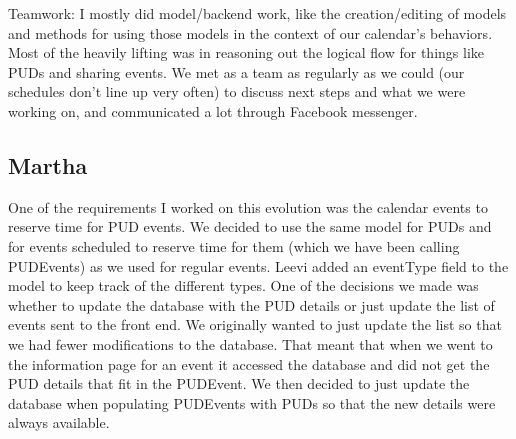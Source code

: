 \documentclass{article}
\begin{document}
Teamwork: I mostly did model/backend work, like the creation/editing of models and methods for using those models in the context of our calendar's behaviors. Most of the heavily lifting was in reasoning out the logical flow for things like PUDs and sharing events. We met as a team as regularly as we could (our schedules don't line up very often) to discuss next steps and what we were working on, and communicated a lot through Facebook messenger.

\subsection{Martha}
One of the requirements I worked on this evolution was the calendar events to reserve time for PUD events.  We decided to use the same model for PUDs and for events scheduled to reserve time for them (which we have been calling PUDEvents) as we used for regular events.  Leevi added an eventType field to the model to keep track of the different types.  One of the decisions we made was whether to update the database with the PUD details or just update the list of events sent to the front end.  We originally wanted to just update the list so that we had fewer modifications to the database.  That meant that when we went to the information page for an event it accessed the database and did not get the PUD details that fit in the PUDEvent.  We then decided to just update the database when populating PUDEvents with PUDs so that the new details were always available.
\end{document}
